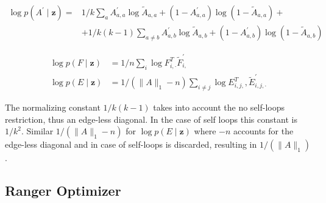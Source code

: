 {\begin{equation}
    \begin{split}
        \log p\left(A^{\prime} \mid \mathbf{z}\right) = &1 / k \sum_{a} A_{a, a}^{\prime} \log \widetilde{A}_{a, a}+\left(1-A_{a, a}^{\prime}\right) \log \left(1-\widetilde{A}_{a, a}\right)+ \\ & +1 / k(k-1) \sum_{a \neq b} A_{a, b}^{\prime} \log \widetilde{A}_{a, b}+\left(1-A_{a, b}^{\prime}\right) \log \left(1-\widetilde{A}_{a, b}\right)
    \end{split}
    \label{eq3:GAVElossA}
\end{equation}

\begin{align}
    \log p(F \mid \mathbf{z}) &=1 / n \sum_{i} \log F_{i, \cdot}^{T} \widetilde{F}_{i,}^{\prime} \\
    \log p(E \mid \mathbf{z}) &=1 /\left(\|A\|_{1}-n\right) \sum_{i \neq j} \log E_{i, j,}^{T}, \widetilde{E}_{i, j, \cdot}^{\prime}
    \label{eq3:GAVElossEF}
\end{align}

The normalizing constant $1 / k(k-1)$ takes into account the no self-loops restriction, thus an edge-less diagonal. In the case of self loops this constant is $1 / k^2$. Similar $1 /\left(\|A\|_{1}-n\right)$ for $\log p(E \mid \mathbf{z})$ where $-n$ accounts for the edge-less diagonal and in case of self-loops is discarded, resulting in $1 /\left(\|A\|_{1}\right)$.

\subsection{Ranger Optimizer}
\label{sec3:ranger}

}
